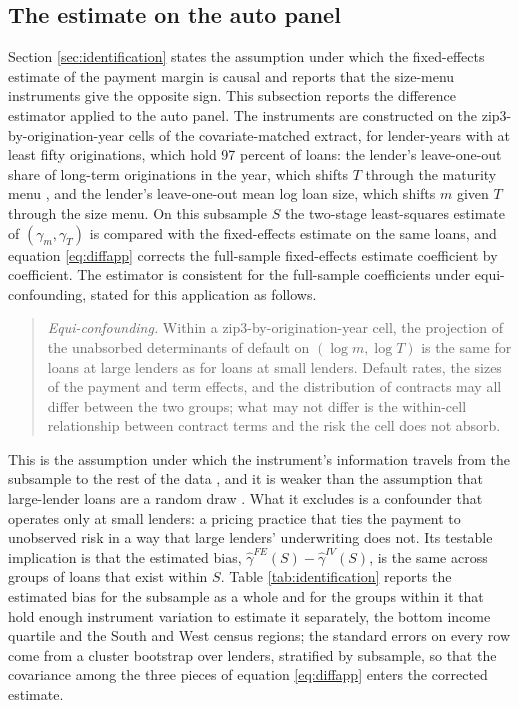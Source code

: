 \subsection{The estimate on the auto panel}\label{appendix:ivvalidation:auto}

Section \ref{sec:identification} states the assumption under which the fixed-effects estimate of the payment margin is causal and reports that the size-menu instruments give the opposite sign. This subsection reports the difference estimator applied to the auto panel. The instruments are constructed on the zip3-by-origination-year cells of the covariate-matched extract, for lender-years with at least fifty originations, which hold 97 percent of loans: the lender's leave-one-out share of long-term originations in the year, which shifts $T$ through the maturity menu \citep{argyle_monthly_2020, hertzberg_screening_2018}, and the lender's leave-one-out mean log loan size, which shifts $m$ given $T$ through the size menu. On this subsample $S$ the two-stage least-squares estimate of $(\gamma_m, \gamma_T)$ is compared with the fixed-effects estimate on the same loans, and equation \eqref{eq:diffapp} corrects the full-sample fixed-effects estimate coefficient by coefficient. The estimator is consistent for the full-sample coefficients under equi-confounding, stated for this application as follows.

\begin{quote}
\emph{Equi-confounding.} Within a zip3-by-origination-year cell, the projection of the unabsorbed determinants of default on $(\log m, \log T)$ is the same for loans at large lenders as for loans at small lenders. Default rates, the sizes of the payment and term effects, and the distribution of contracts may all differ between the two groups; what may not differ is the within-cell relationship between contract terms and the risk the cell does not absorb.
\end{quote}

\noindent This is the assumption under which the instrument's information travels from the subsample to the rest of the data \citep{li_identification_2024, angrist_leveraging_2017}, and it is weaker than the assumption that large-lender loans are a random draw \citep{hotz_predicting_2005}. What it excludes is a confounder that operates only at small lenders: a pricing practice that ties the payment to unobserved risk in a way that large lenders' underwriting does not. Its testable implication is that the estimated bias, $\hat\gamma^{FE}(S) - \hat\gamma^{IV}(S)$, is the same across groups of loans that exist within $S$. Table \ref{tab:identification} reports the estimated bias for the subsample as a whole and for the groups within it that hold enough instrument variation to estimate it separately, the bottom income quartile and the South and West census regions; the standard errors on every row come from a cluster bootstrap over lenders, stratified by subsample, so that the covariance among the three pieces of equation \eqref{eq:diffapp} enters the corrected estimate.

